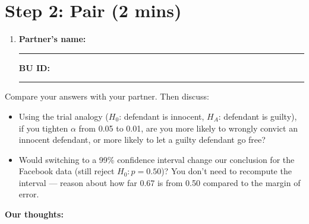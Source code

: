 \documentclass{article}
\newcommand{\nameblank}{\rule{1.75in}{0.4pt}}
\newcommand{\idblank}{\rule{1.55in}{0.4pt}}
\begin{document}
\newpage
\section*{Step 2: Pair (2 mins)}

\begin{enumerate}[label=\arabic*.,leftmargin=*,itemsep=.7em, start=2]
  \item \textbf{Partner's name:} \nameblank \hfill \textbf{BU ID:} \idblank
\end{enumerate}

Compare your answers with your partner. Then discuss:

\begin{itemize}
  \item Using the trial analogy ($H_0$: defendant is innocent, $H_A$: defendant is guilty), if you tighten $\alpha$ from 0.05 to 0.01, are you more likely to wrongly convict an innocent defendant, or more likely to let a guilty defendant go free?
  \item Would switching to a 99\% confidence interval change our conclusion for the Facebook data (still reject $H_0: p=0.50$)? You don't need to recompute the interval --- reason about how far 0.67 is from 0.50 compared to the margin of error.
\end{itemize}

\textbf{Our thoughts:}
\vfill
\end{document}
